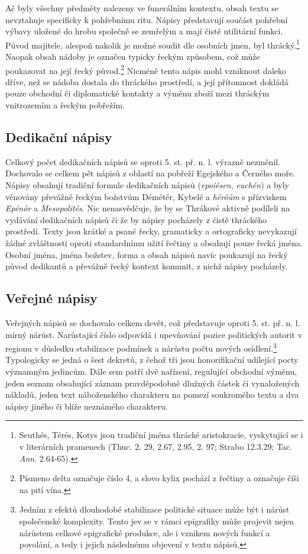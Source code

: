 Ač byly všechny předměty nalezeny ve funerálním kontextu, obsah textu se nevztahuje specificky k pohřebnímu ritu. Nápisy představují součást pohřební výbavy uložené do hrobu společně se zemřelým a mají čistě utilitární funkci. Původ majitele, alespoň nakolik je možné soudit dle osobních jmen, byl thrácký.\footnote{Seuthés, Térés, Kotys jsou tradiční jména thrácké aristokracie, vyskytující se i v literárních pramenech (Thuc. 2. 29, 2.67, 2.95, 2. 97; Strabo 12.3.29; Tac. {\em Ann}. 2.64-65).} Naopak obsah nádoby je označen typicky řeckým způsobem, což může poukazovat na její řecký původ.\footnote{Písmeno delta označuje číslo 4, a slovo kylix pochází z řečtiny a označuje číši na pití vína.} Nicméně tento nápis mohl vzniknout daleko dříve, než se nádoba dostala do thráckého prostředí, a její přítomnost dokládá pouze obchodní či diplomatické kontakty a výměnu zboží mezi thráckým vnitrozemím a řeckým pobřežím.

\subsection[dedikační-nápisy-3]{Dedikační nápisy}

Celkový počet dedikačních nápisů se oproti 5. st. př. n. l. výrazně nezměnil. Dochovalo se celkem pět nápisů z oblastí na pobřeží Egejského a Černého moře. Nápisy obsahují tradiční formule dedikačních nápisů ({\em epoiésen}, {\em euchén}) a byly věnovány převážně řeckým božstvům Démétér, Kybelé a {\em héróům} s přízviskem {\em Epénór} a {\em Mesopolités}. Nic nenasvědčuje, že by se Thrákové aktivně podíleli na vydávání dedikačních nápisů či že by nápisy pocházely z čistě thráckého prostředí. Texty jsou krátké a psané řecky, gramaticky a ortograficky nevykazují žádné zvláštnosti oproti standardnímu užití řečtiny a obsahují pouze řecká jména. Osobní jména, jména božstev, forma a obsah nápisů navíc poukazují na řecký původ dedikantů a převážně řecký kontext komunit, z nichž nápisy pocházely.

\subsection[veřejné-nápisy-3]{Veřejné nápisy}

Veřejných nápisů se dochovalo celkem devět, což představuje oproti 5. st. př. n. l. mírný nárůst. Narůstající číslo odpovídá i upevňování pozice politických autorit v regionu v důsledku stabilizace podmínek a nárůstu počtu nových osídlení.\footnote{Jedním z efektů dlouhodobé stabilizace politické situace může být i nárůst společenské komplexity. Tento jev se v rámci epigrafiky může projevit nejen nárůstem celkové epigrafické produkce, ale i vznikem nových funkcí a povolání, a tedy i jejich následnému objevení v textu nápisů.} Typologicky se jedná o šest dekretů, z čehož tři jsou honorifikační udílející pocty významným jedincům. Dále sem patří dvě nařízení, regulující obchodní výměnu, jeden seznam obsahující záznam pravděpodobně dlužných částek či vynaložených nákladů, jeden text náboženského charakteru na pomezí soukromého textu a dva nápisy jiného či blíže neznámého charakteru.

